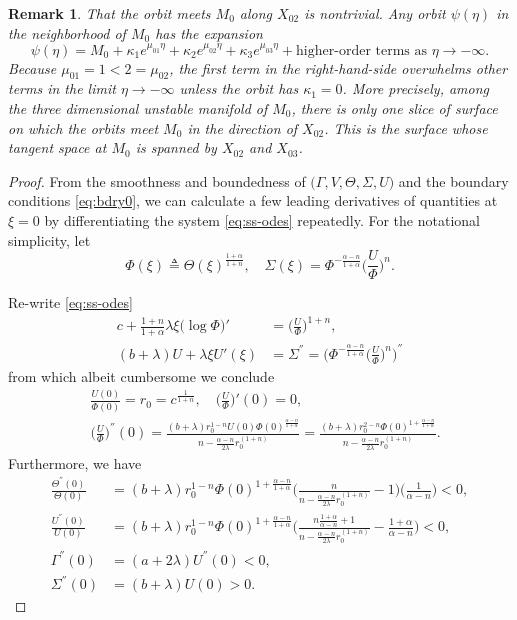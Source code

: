 \documentclass[a4paper,11pt]{article}
\newtheorem{remark}{Remark}[section]
\begin{document}
\begin{remark} \label{rem:alpha}
  That the orbit meets $M_0$ along $X_{02}$ is nontrivial. Any orbit $\psi(\eta)$ in the neighborhood of $M_0$ has the expansion
  $$  \psi(\eta) = M_0 + \kappa_1 e^{\mu_{01}\eta} + \kappa_2 e^{\mu_{02}\eta} + \kappa_3 e^{\mu_{03}\eta} + \text{higher-order terms as $\eta \rightarrow -\infty$}.$$
  Because $\mu_{01}=1<2=\mu_{02}$, the first term in the right-hand-side overwhelms other terms in the limit $\eta \rightarrow -\infty$ unless the orbit has $\kappa_1=0$. More precisely, among the three dimensional unstable manifold of $M_0$, there is only one slice of surface on which the orbits meet $M_0$ in the direction of $X_{02}$. This is the surface whose tangent space at $M_0$ is spanned by $X_{02}$ and $X_{03}$.
\end{remark}
\begin{proof}
From the smoothness and boundedness of $\big(\Gamma,V,\Theta,\Sigma,U\big)$ and the boundary conditions \eqref{eq:bdry0}, we can calculate a few leading derivatives of quantities at $\xi=0$ by differentiating the system \eqref{eq:ss-odes} repeatedly. For the notational simplicity, let
$$\Phi(\xi) \triangleq \Theta(\xi)^{\frac{1+\alpha}{1+n}}, \quad \Sigma(\xi) = \Phi^{-\frac{\alpha-n}{1+\alpha}} \Big(\frac{U}{\Phi}\Big)^n.$$

Re-write \eqref{eq:ss-odes}
\begin{align*}
  c + \frac{1+n}{1+\alpha} \lambda \xi \big(\log\Phi\big)' &= \Big(\frac{U}{\Phi}\Big)^{1+n},\\
  (b+\lambda)U  + \lambda \xi U'(\xi) &= \Sigma^{''} = \Big(\Phi^{-\frac{\alpha-n}{1+\alpha}}\Big(\frac{U}{\Phi}\Big)^{n}\Big)^{''}
\end{align*}
from which albeit cumbersome we conclude
\begin{align*}
&\frac{U(0)}{\Phi(0)} = r_0 = c^{\frac{1}{1+n}},  \quad \Big(\frac{U}{\Phi}\Big)'(0)=0, \\
&\Big(\frac{U}{\Phi}\Big)^{''}(0) = \frac{ (b+\lambda) r_0^{1-n} U(0)\Phi(0)^{\frac{\alpha-n}{1+\alpha}} }{ n - \frac{\alpha-n}{2\lambda}r_0^{(1+n)}} = \frac{ (b+\lambda) r_0^{2-n} \Phi(0)^{1+\frac{\alpha-n}{1+\alpha}} }{ n - \frac{\alpha-n}{2\lambda}r_0^{(1+n)}}.
\end{align*}
Furthermore, we have
\begin{equation} \label{eq:second_der}
\begin{aligned}
\frac{\Theta^{''}(0)}{\Theta(0)} &= (b+\lambda)r_0^{1-n}\Phi(0)^{1+\frac{\alpha-n}{1+\alpha}} \Big(\frac{n}{ n - \frac{\alpha-n}{2\lambda}r_0^{(1+n)}} -1\Big)\Big(\frac{1}{\alpha-n}\Big) < 0,\\
\frac{U^{''}(0)}{U(0)} &=(b+\lambda)r_0^{1-n}\Phi(0)^{1+\frac{\alpha-n}{1+\alpha}} \Big(\frac{n\frac{1+\alpha}{\alpha-n}+1}{ n - \frac{\alpha-n}{2\lambda}r_0^{(1+n)}} -\frac{1+\alpha}{\alpha-n}\Big) < 0,\\
\Gamma^{''}(0)&=(a+2\lambda)U^{''}(0) <0,\\
\Sigma^{''}(0)&=(b+\lambda)U(0)>0.
\end{aligned}
\end{equation}


\end{proof}
\end{document}
